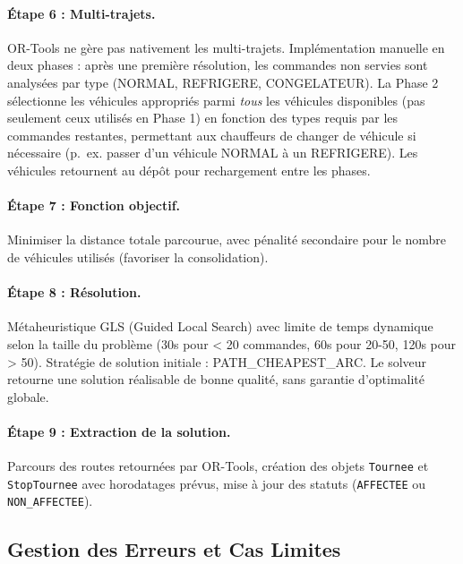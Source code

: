 \documentclass[12pt,a4paper]{report}
\begin{document}
\paragraph{Étape 6 : Multi-trajets.}
OR-Tools ne gère pas nativement les multi-trajets. Implémentation manuelle en deux phases : après une première résolution, les commandes non servies sont analysées par type (NORMAL, REFRIGERE, CONGELATEUR). La Phase 2 sélectionne les véhicules appropriés parmi \emph{tous} les véhicules disponibles (pas seulement ceux utilisés en Phase 1) en fonction des types requis par les commandes restantes, permettant aux chauffeurs de changer de véhicule si nécessaire (p.~ex. passer d'un véhicule NORMAL à un REFRIGERE). Les véhicules retournent au dépôt pour rechargement entre les phases.

\paragraph{Étape 7 : Fonction objectif.}
Minimiser la distance totale parcourue, avec pénalité secondaire pour le nombre de véhicules utilisés (favoriser la consolidation).

\paragraph{Étape 8 : Résolution.}
Métaheuristique GLS (Guided Local Search) avec limite de temps dynamique selon la taille du problème (30s pour < 20 commandes, 60s pour 20-50, 120s pour > 50). Stratégie de solution initiale : PATH\_CHEAPEST\_ARC. Le solveur retourne une solution réalisable de bonne qualité, sans garantie d'optimalité globale.

\paragraph{Étape 9 : Extraction de la solution.}
Parcours des routes retournées par OR-Tools, création des objets \texttt{Tournee} et \texttt{StopTournee} avec horodatages prévus, mise à jour des statuts (\texttt{AFFECTEE} ou \texttt{NON\_AFFECTEE}).

\subsection{Gestion des Erreurs et Cas Limites}
\end{document}
